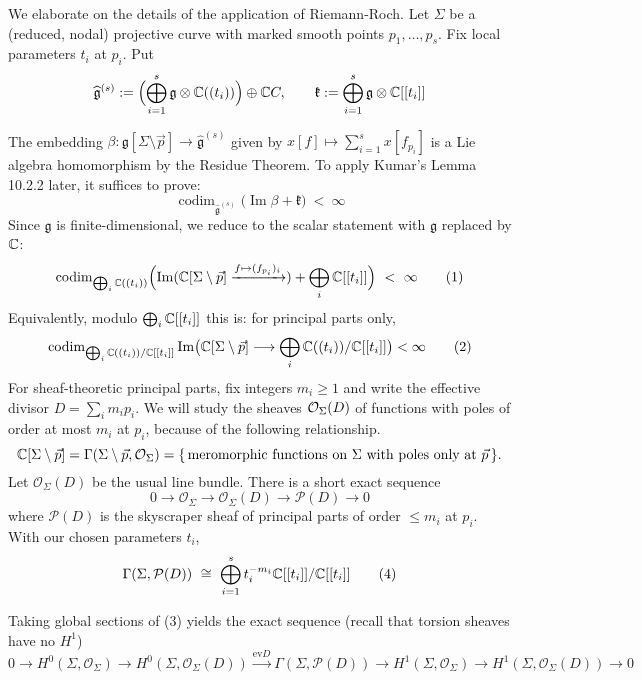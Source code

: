\documentclass[12pt]{article}
\begin{document}
\begin{remark}
    We elaborate on the details of the application of Riemann-Roch. Let $\Sigma$ be a (reduced, nodal) projective curve with marked smooth points $p_1,\dots,p_s$. Fix local parameters $t_i$ at $p_i$. Put
    \[
        \widehat{\mathfrak g}^{(s)}
        :=\Bigl(\bigoplus_{i=1}^s \mathfrak g\otimes \mathbb{C}((t_i))\Bigr)\oplus \mathbb{C} C,
        \qquad
        \mathfrak k:=\bigoplus_{i=1}^s \mathfrak g\otimes \mathbb{C}[[t_i]]
    \]

    The embedding $\beta: \mathfrak g[\Sigma\setminus\vec p]\to \widehat{\mathfrak g}^{(s)}$ given by $x[f]\mapsto \sum_{i=1}^s x[f_{p_i}]$ is a Lie algebra homomorphism by the Residue Theorem. To apply Kumar's Lemma 10.2.2 later, it suffices to prove:
    \[
        \operatorname{codim}_{\widehat{\mathfrak g}^{(s)}}
        \bigl(\operatorname{Im}\beta+\mathfrak k \bigr)\ <\ \infty
    \]
    Since $\mathfrak g$ is finite-dimensional, we reduce to the scalar statement with $\mathfrak g$ replaced by $\mathbb{C}$:
    \[
        \operatorname{codim}_{\bigoplus_i \mathbb{C}((t_i))}
        \Bigl(\operatorname{Im}(\mathbb{C}[\Sigma\setminus\vec p]\xrightarrow{f\mapsto (f_{p_i})_i})
        +\bigoplus_i \mathbb{C}[[t_i]]\Bigr)\ <\ \infty
        \tag{1}
    \]
    Equivalently, modulo $\bigoplus_i\mathbb{C}[[t_i]]$ this is: for principal parts only,
    \[
        \operatorname{codim}_{\bigoplus_i \mathbb{C}((t_i))/\mathbb{C}[[t_i]]}
        \operatorname{Im}\bigl(\mathbb{C}[\Sigma\setminus\vec p]\longrightarrow \bigoplus_i \mathbb{C}((t_i))/\mathbb{C}[[t_i]]\bigr)
        <\infty
        \tag{2}
    \]
    For sheaf-theoretic principal parts, fix integers $m_i\ge 1$ and write the effective divisor $D=\sum_i m_i p_i$. We will study the sheaves ${\mathcal{O}}_\Sigma(D)$ of functions with poles of order at most $m_i$ at $p_i$, because of the following relationship.
    \[
        \mathbb{C}[\Sigma\setminus\vec p]=\Gamma(\Sigma\setminus\vec p,\mathcal O_\Sigma)
        =\{\,\text{meromorphic functions on }\Sigma\text{ with poles only at }\vec p\,\}.
    \]
    Let $\mathcal O_\Sigma(D)$ be the usual line bundle. There is a short exact sequence
    \[
        0 \longrightarrow \mathcal O_\Sigma
        \longrightarrow \mathcal O_\Sigma(D)
        \longrightarrow \mathcal P(D)\longrightarrow 0
        \tag{3}
    \]
    where $\mathcal P(D)$ is the skyscraper sheaf of principal parts of order $\le m_i$ at $p_i$. With our chosen parameters $t_i$,
    \[
        \Gamma(\Sigma,\mathcal P(D))\ \cong\ \bigoplus_{i=1}^s t_i^{-m_i}\C[[t_i]]/\C[[t_i]]
        \tag{4}
    \]

    Taking global sections of (3) yields the exact sequence (recall that torsion sheaves have no $H^1$)
    \[
        0\to H^0(\Sigma,\mathcal O_\Sigma)\to H^0(\Sigma,\mathcal O_\Sigma(D))
        \overset{\mathrm{ev}D}{\longrightarrow}\Gamma(\Sigma,\mathcal P(D))
        \longrightarrow H^1(\Sigma,\mathcal O_\Sigma)\to H^1(\Sigma,\mathcal O_\Sigma(D))\to 0
    \]


\end{remark}
\end{document}
